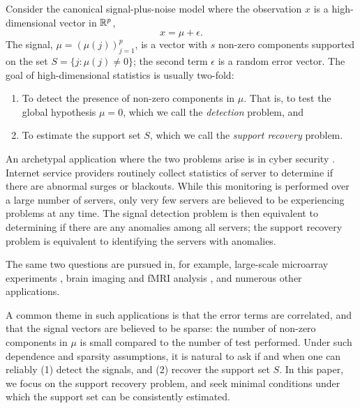 
Consider the canonical signal-plus-noise model where the observation $x$ is a high-dimensional vector in $\mathbb R^p$,
\begin{equation} \label{eq:model}
    x = \mu + \epsilon.
\end{equation}
The signal, $\mu = (\mu(j))_{j=1}^p$, is a vector with $s$ non-zero components supported on the set $S=\{j:\mu(j)\neq 0\}$; the second term $\epsilon$ is a random error vector. 
The goal of high-dimensional statistics is usually two-fold: 
\begin{enumerate}
    \item To detect the presence of non-zero components in $\mu$. That is, to test the global hypothesis $\mu = 0$, which we call the \emph{detection} problem, and
    \item To estimate the support set $S$, which we call the \emph{support recovery} problem.
\end{enumerate}
An archetypal application where the two problems arise is in cyber security \citep{kallitsis2016amon}.
Internet service providers routinely collect statistics of server to determine if there are abnormal surges or blackouts.
While this monitoring is performed over a large number of servers, only very few servers are believed to be experiencing problems at any time.
The signal detection problem is then equivalent to determining if there are any anomalies among all servers; the support recovery problem is equivalent to identifying the servers with anomalies.

The same two questions are pursued in, for example, large-scale microarray experiments \citep{dudoit2003multiple}, brain imaging and fMRI analysis \citep{nichols2003controlling}, and numerous other applications.

A common theme in such applications is that the error terms are correlated, and that the signal vectors are believed to be sparse: the number of non-zero components in $\mu$ is small compared to the number of test performed.
Under such dependence and  sparsity assumptions, it is natural to ask if and when one can reliably {(1)} detect the signals, and {(2)} recover the support set $S$.
In this paper, we focus on the support recovery problem, and seek minimal conditions under which the support set can be consistently estimated.

